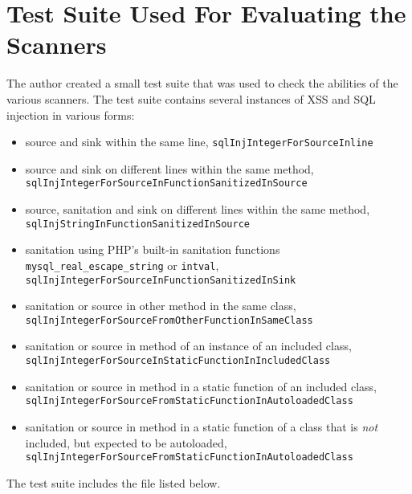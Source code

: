 \chapter{Test Suite Used For Evaluating the Scanners}
\label{testsuite}

The author created a small test suite that was used to check the abilities of the various scanners. The test suite contains several instances of XSS and SQL injection in various forms:
\begin{itemize}
 \item source and sink within the same line, \eg \texttt{sqlInjIntegerForSourceInline}
 \item source and sink on different lines within the same method, \eg \texttt{sqlInjIntegerForSourceInFunctionSanitizedInSource}
 \item source, sanitation and sink on different lines within the same method, \eg \texttt{sqlInjStringInFunctionSanitizedInSource}
 \item sanitation using PHP's built-in sanitation functions \texttt{mysql\_real\_escape\_string} or \texttt{intval}, \eg \texttt{sqlInjIntegerForSourceInFunctionSanitizedInSink}
 \item sanitation or source in other method in the same class, \eg \texttt{sqlInjIntegerForSourceFromOtherFunctionInSameClass}
 \item sanitation or source in method of an instance of an included class, \eg \texttt{sqlInjIntegerForSourceInStaticFunctionInIncludedClass}
 \item sanitation or source in method in a static function of an included class, \eg \texttt{sqlInjIntegerForSourceFromStaticFunctionInAutoloadedClass}
 \item sanitation or source in method in a static function of a class that is \emph{not} included, but expected to be autoloaded, \eg \texttt{sqlInjIntegerForSourceFromStaticFunctionInAutoloadedClass}
\end{itemize}

The test suite includes the file listed below.



